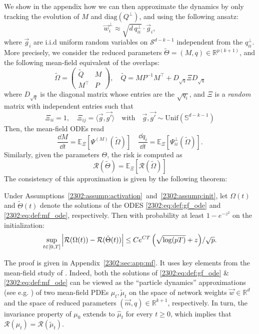 We show in the appendix how we can then approximate the dynamics by only tracking the evolution of $M$ and $\mathrm{diag}(Q^\bot)$, and using the following ansatz:
\begin{equation}
\label{2302:eq:mf_approx_lowd}
    \vec{w}^\bot_i \approx \sqrt{d\, q_{ii}^\bot} \cdot \vec{g}_i,
\end{equation}
where $\vec{g}_i$ are i.i.d uniform random variables on $\mathcal S^{d-k-1}$ independent from the $q_{ii}^\bot$. More precisely, we consider the reduced parameters $\tilde\Theta = (M, q) \in \mathbb R^{p(k+1)}$, and the following mean-field equivalent of the  overlaps:
\begin{equation}
\label{2302:eq:def:overlaps_mf}
\tilde\Omega = \begin{pmatrix} \tilde Q & M \\
    M^\top & P 
\end{pmatrix}, \quad \tilde{Q} = MP^{-1}M^\top +   D_{\sqrt{q}} \Xi D_{\sqrt{q}}
\end{equation}
where $D_{\sqrt{q}}$ is the diagonal matrix whose entries are the $\sqrt{q_{i}}$, and $\Xi$ is a \emph{random} matrix with independent entries such that
\[\Xi_{ii} = 1, \quad \Xi_{ij} = \langle \vec{g}, \vec{g'} \rangle \quad \text{with}\quad  \vec{g}, \vec{g'} \sim \mathrm{Unif}\left(\mathbb S^{d-k-1}\right)\]
Then, the mean-field ODEs read
\begin{equation}
\label{2302:eq:def:mf_ode}
    \frac{\dd M}{\dd t} = \mathbb{E}_{\Xi}\left[\Psi^{(M)}(\tilde\Omega)\right] \quad \frac{\dd q_i}{\dd t} = \mathbb{E}_{\Xi}\left[\Psi^{\bot}_{ii}(\tilde\Omega)\right].
\end{equation}
Similarly, given the parameters $\Theta$, the risk is computed as
\begin{equation}\label{2302:eq:def:mf_risk}
    \mathcal{R}(\tilde\Theta) = \mathbb{E}_{\Xi}\left[\mathcal{R}(\tilde\Omega)\right]
\end{equation}
The consistency of this approximation is given by the following theorem:
\begin{theorem}\label{2302:thm:mf_approx_lowd_bound}
 Under Assumptions~\ref{2302:assump:activation}~and~\ref{2302:assump:init}, let ${\Omega}(t)$ and $\tilde{{\Theta}}(t)$ denote the solutions of the ODES \eqref{2302:eq:def:gf_ode} and \eqref{2302:eq:def:mf_ode}, respectively. Then with probability at least $1 - e^{-z^2}$ on the initialization:
    \[ \sup_{t \in [0, T]} \left| \mathcal R(\mathrm{\Omega}(t)) - \mathcal R(\tilde{\mathrm{\Theta}}(t)) \right| \leq {Ce^{CT} \left(\sqrt{\log(pT)} + z \right)}/{\sqrt{p}} .\]
\end{theorem}
The proof is given in Appendix~\ref{2302:sec:app:mf}. It uses key elements from the mean-field study of \cite{mei2019mean}. Indeed, both the solutions of \eqref{2302:eq:def:gf_ode} \& \eqref{2302:eq:def:mf_ode} can be viewed as the ``particle dynamics'' approximations (see e.g. \cite{chertock2017practical}) of two mean-field PDEs $\mu_t, \tilde\mu_t$ on the space of network weights $\vec{w} \in \mathbb{R}^{d}$ and the space of reduced parameters $(\vec{m}, q) \in \mathbb{R}^{k+1}$, respectively. In turn, the invariance property of $\mu_0$ extends to $\hat\mu_t$ for every $t \geq 0$, which implies that $\mathcal R(\mu_t) = \mathcal R(\tilde\mu_t)$. 

